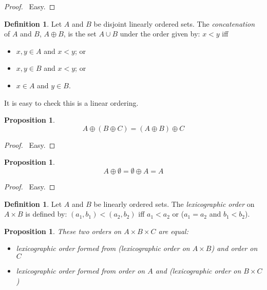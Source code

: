 \documentclass{article}
\let\qed\relax
\newtheorem{proposition}[axiom]{Proposition}
\theoremstyle{definition}
\newtheorem{definition}[axiom]{Definition}
\begin{document}
    \begin{proof}
        \pf\ Easy. \qed
    \end{proof}

    \begin{definition}
        Let $A$ and $B$ be disjoint linearly ordered sets. The \emph{concatenation} of $A$ and $B$,
        $A \oplus B$, is the set $A \cup B$ under the order given by: $x < y$ iff
        \begin{itemize}
            \item $x, y \in A$ and $x < y$; or
            \item $x, y \in B$ and $x < y$; or
            \item $x \in A$ and $y \in B$.
        \end{itemize}

        It is easy to check this is a linear ordering.
    \end{definition}

    \begin{proposition}
        \[ A \oplus (B \oplus C) = (A \oplus B) \oplus C \]
    \end{proposition}

    \begin{proof}
        \pf\ Easy. \qed
    \end{proof}

    \begin{proposition}
        \[ A \oplus \emptyset = \emptyset \oplus A = A \]
    \end{proposition}

    \begin{proof}
        \pf\ Easy. \qed
    \end{proof}

    \begin{definition}
        Let $A$ and $B$ be linearly ordered sets. The \emph{lexicographic order} on $A \times B$ is
        defined by: $(a_1,b_1) < (a_2,b_2)$ iff $a_1 < a_2$ or ($a_1 = a_2$ and $b_1 < b_2$).
    \end{definition}

    \begin{proposition}
        These two orders on $A \times B \times C$ are equal:
        \begin{itemize}
            \item lexicographic order formed from (lexicographic order on $A \times B$) and order on $C$
            \item lexicographic order formed from order on $A$ and (lexicographic order on $B \times C$)
        \end{itemize}
    \end{proposition}
\end{document}
